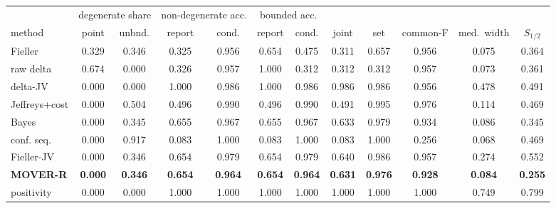 \begin{tabular}{@{}lccccccccccc@{}}
\toprule
 & \multicolumn{2}{c}{degenerate share} & \multicolumn{2}{c}{non-degenerate acc.} & \multicolumn{2}{c}{bounded acc.} & & & & \\
\cmidrule(lr){2-3}\cmidrule(lr){4-5}\cmidrule(lr){6-7}
method & point & unbnd. & report & cond. & report & cond. & joint & set & common-F & med.\ width & $S_{1/2}$ \\
\midrule
Fieller & 0.329 & 0.346 & 0.325 & 0.956 & 0.654 & 0.475 & 0.311 & 0.657 & 0.956 & 0.075 & 0.364 \\
raw delta & 0.674 & 0.000 & 0.326 & 0.957 & 1.000 & 0.312 & 0.312 & 0.312 & 0.957 & 0.073 & 0.361 \\
delta-JV & 0.000 & 0.000 & 1.000 & 0.986 & 1.000 & 0.986 & 0.986 & 0.986 & 0.956 & 0.478 & 0.491 \\
Jeffreys+cost & 0.000 & 0.504 & 0.496 & 0.990 & 0.496 & 0.990 & 0.491 & 0.995 & 0.976 & 0.114 & 0.469 \\
\midrule
Bayes & 0.000 & 0.345 & 0.655 & 0.967 & 0.655 & 0.967 & 0.633 & 0.979 & 0.934 & 0.086 & 0.345 \\
conf. seq. & 0.000 & 0.917 & 0.083 & 1.000 & 0.083 & 1.000 & 0.083 & 1.000 & 0.256 & 0.068 & 0.469 \\
Fieller-JV & 0.000 & 0.346 & 0.654 & 0.979 & 0.654 & 0.979 & 0.640 & 0.986 & 0.957 & 0.274 & 0.552 \\
\textbf{MOVER-R} & \textbf{0.000} & \textbf{0.346} & \textbf{0.654} & \textbf{0.964} & \textbf{0.654} & \textbf{0.964} & \textbf{0.631} & \textbf{0.976} & \textbf{0.928} & \textbf{0.084} & \textbf{0.255} \\
positivity & 0.000 & 0.000 & 1.000 & 1.000 & 1.000 & 1.000 & 1.000 & 1.000 & 1.000 & 0.749 & 0.799 \\
\bottomrule
\end{tabular}
